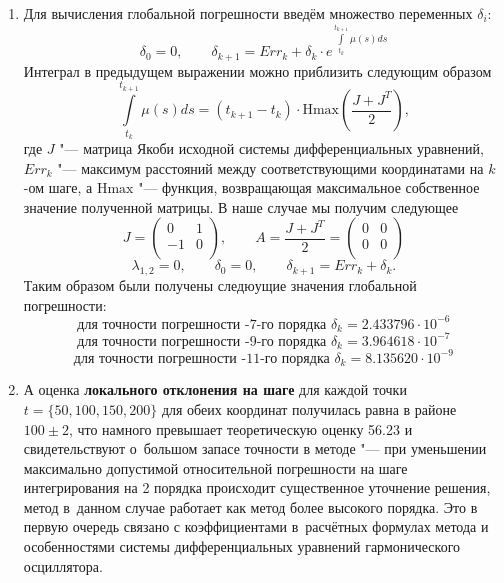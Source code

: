 \begin{enumerate}
\item 
Для вычисления глобальной погрешности введём множество переменных $\delta_i:$ 
\[
 \delta_0 = 0, \qquad \delta_{k+1} = Err_{k} + \delta_{k} \cdot e^{\int\limits_{t_k}^{t_{k+1}} \mu(s) ds} 
\]
Интеграл в предыдущем выражении можно приблизить следующим образом
\[
\int\limits_{t_k}^{t_{k+1}} \mu(s) ds = (t_{k+1} - t_k) \cdot \mathrm{Hmax} \left(\frac{J + J^T}{2} \right),
\]
где $J$ "--- матрица Якоби исходной системы дифференциальных уравнений,  $Err_k$ "--- максимум расстояний между соответствующими координатами на $k$-ом шаге, а $\mathrm{Hmax}$ "--- функция, возвращающая максимальное собственное значение полученной матрицы. 
В наше случае мы получим следующее
\[
J = \left(
\begin{array}{cc}
 0 & 1 \\
 -1 & 0 \\
\end{array}
\right),
\qquad
A = \frac{J + J^T}{2} =
\left(
\begin{array}{cc}
 0 & 0 \\
 0 & 0 \\
\end{array}
\right)
\]
\[
\lambda_{1,2} = 0, \qquad \delta_0 = 0, \qquad \delta_{k+1} = Err_{k} + \delta_{k}.
\]
Таким образом были получены следюущие значения глобальной погрешности:
\[
\text{для точности погрешности -7-го порядка } \delta_k =  2.433796 \cdot 10^{-6}
\]
\[
\text{для точности погрешности -9-го порядка } \delta_k =  3.964618 \cdot 10^{-7}
\]
\[
\text{для точности погрешности -11-го порядка } \delta_k =  8.135620 \cdot 10^{-9}
\]

\item А оценка {\bf локального отклонения на шаге} для каждой точки $t = \{50, 100, 150, 200\}$ для обеих координат получилась равна в районе $100 \pm 2$, что намного превышает теоретическую оценку 56.23 и свидетельствуют о~большом запасе точности в методе "--- при уменьшении максимально допустимой относительной погрешности на шаге интегрирования на 2 порядка происходит существенное уточнение решения, метод в~данном случае работает как метод более высокого порядка. Это в первую очередь связано с коэффициентами в~расчётных формулах метода и особенностями системы дифференциальных уравнений гармонического осциллятора.
\end{enumerate}

